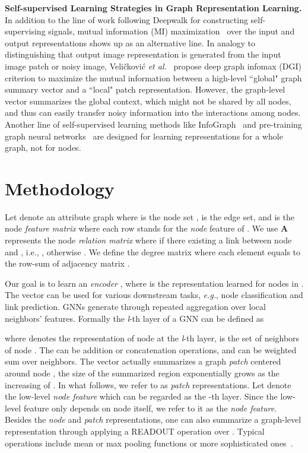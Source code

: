 \documentclass[preprint]{article}
\begin{document}
\textbf{Self-supervised Learning Strategies in Graph Representation Learning.}  
In addition to the line of work following Deepwalk for constructing self-supervising signals, mutual information (MI) maximization~\cite{velivckovic2018deep} over the input and output representations shows up as an alternative line. In analogy to distinguishing that output image representation is generated from the input image patch or noisy image, Veli{\v{c}}kovi{\'c} \emph{et al.}~\cite{velivckovic2018deep} propose deep graph infomax (DGI) criterion to maximize the mutual information between a high-level ``global" graph summary vector and a ``local" patch representation.  However, the graph-level vector summarizes the global context, which might not be shared by all nodes, and thus can easily transfer noisy information into the interactions among nodes.   Another line of self-supervised learning methods like InfoGraph~\cite{sun2019infograph} and pre-training graph neural networks~\cite{hu2019strategies} are designed for learning representations for a whole graph, not for nodes.

\section{Methodology} \label{sec:mtd}
Let  denote an   attribute graph where  is the node set  ,   is the edge set, and  is the node \emph{feature matrix} where each row  stands for the \emph{node} feature of . We use \textbf{A} represents the node \emph{relation matrix}  where   if there existing a link between node  and , i.e., , otherwise . We define the degree matrix  where each element equals to the row-sum of adjacency matrix . 

Our goal is to learn an \emph{encoder}  , where  is the representation learned for nodes in . The vector    
can be used for various downstream tasks, \emph{e.g.}, node classification and link prediction. GNNs generate  through repeated aggregation over local neighbors' features.  Formally the \emph{l}-th layer of a GNN can be defined as

where  denotes the representation of node  at the \emph{l}-th layer,  is the set of neighbors of node . The  can be addition or concatenation operations, and  can be weighted sum over neighbors. 
The vector    actually summarizes a graph \emph{patch} centered around node , the size of the summarized  region    exponentially grows as the increasing of . In what follows, we   refer to  as \emph{patch} representations.
Let  denote the low-level \emph{node feature} which can be regarded as the -th layer. Since the low-level feature  only depends on node  itself, we refer to it as the \emph{node feature}.   Besides the \emph{node} and \emph{patch} representations, one can also summarize a graph-level representation   through applying a READOUT operation over . Typical operations include mean or max pooling functions or more sophisticated ones~\cite{ying2018hierarchical}. 
\end{document}

